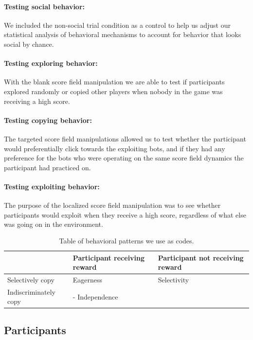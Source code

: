 \documentclass[12pt,letterpaper]{article}
\begin{document}
\paragraph{Testing social behavior:} We included the non-social trial condition as a control to help us adjust our statistical analysis of behavioral mechanisms to account for behavior that looks social by chance. 

\paragraph{Testing exploring behavior:}  With the blank score field manipulation we are able to test if participants explored randomly or copied other players when nobody in the game was receiving a high score. 

\paragraph{Testing copying behavior:}  The targeted score field manipulations allowed us to test whether the participant would preferentially click towards the exploiting bots, and if they had any preference for the bots who were operating on the same score field dynamics the participant had practiced on.

\paragraph{Testing exploiting behavior:}  The purpose of the localized score field manipulation was to see whether participants would exploit when they receive a high score, regardless of what else was going on in the environment.

\begin{table}[]
\begin{tabular}{l|l|l}
                      & Participant receiving reward & Participant not receiving reward  \\ \hline
Selectively copy  & Eagerness                  & \multicolumn{1}{l|}{Selectivity} \\ \hline
Indiscriminately copy &  \multicolumn{2}{l|}{ - Independence}  \\ \cline{1-3} 
\end{tabular}
\caption{Table of behavioral patterns we use as codes.}
\end{table}

\subsection{Participants}
\end{document}
